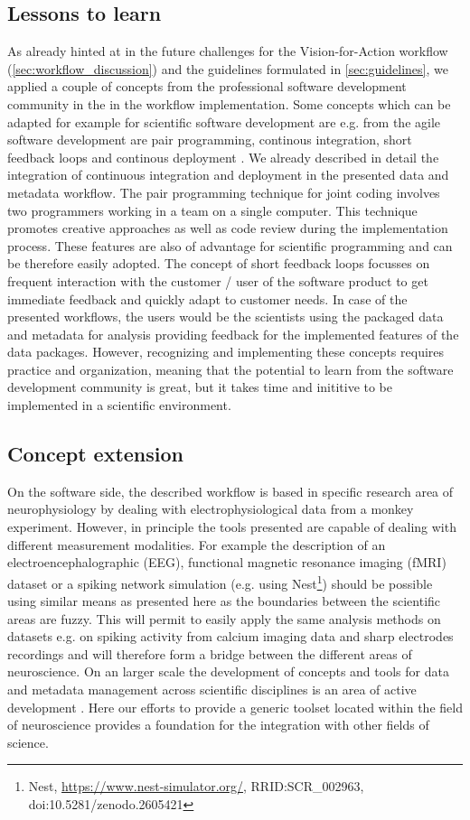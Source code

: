 \subsection{Lessons to learn}
As already hinted at in the future challenges for the Vision-for-Action workflow (\cref{sec:workflow_discussion}) and the guidelines formulated in \cref{sec:guidelines}, we applied a couple of concepts from the professional software development community in the in the workflow implementation. Some concepts which can be adapted for example for scientific software development are  e.g. from the agile software development are pair programming, continous integration, short feedback loops and continous deployment \citep{Shore_2007}. We already described in detail the integration of continuous integration and deployment in the presented data and metadata workflow. The pair programming technique for joint coding involves two programmers working in a team on a single computer. This technique promotes creative approaches as well as code review during the implementation process. These features are also of advantage for scientific programming and can be therefore easily adopted. The concept of short feedback loops focusses on frequent interaction with the customer / user of the software product to get immediate feedback and quickly adapt to customer needs. In case of the presented workflows, the users would be the scientists using the packaged data and metadata for analysis providing feedback for the implemented features of the data packages. However, recognizing and implementing these concepts requires practice and organization, meaning that the potential to learn from the software development community is great, but it takes time and inititive to be implemented in a scientific environment.

\subsection{Concept extension}
On the software side, the described workflow is based in specific research area of neurophysiology by dealing with electrophysiological data from a monkey experiment. However, in principle the tools presented are capable of dealing with different measurement modalities. For example the description of an electroencephalographic (EEG), functional magnetic resonance imaging (fMRI) dataset or a spiking network simulation (e.g. using Nest\footnote{Nest, \url{https://www.nest-simulator.org/}, RRID:SCR\_002963, doi:10.5281/zenodo.2605421}) should be possible using similar means as presented here as the boundaries between the scientific areas are fuzzy. This will permit to easily apply the same analysis methods on datasets e.g. on spiking activity from calcium imaging data and sharp electrodes recordings and will therefore form a bridge between the different areas of neuroscience.
On an larger scale the development of concepts and tools for data and metadata management across scientific disciplines is an area of active development \cite{Amari_2002, Cheung_2009, Nichols_2015}. Here our efforts to provide a generic toolset located within the field of neuroscience provides a foundation for the integration with other fields of science.

